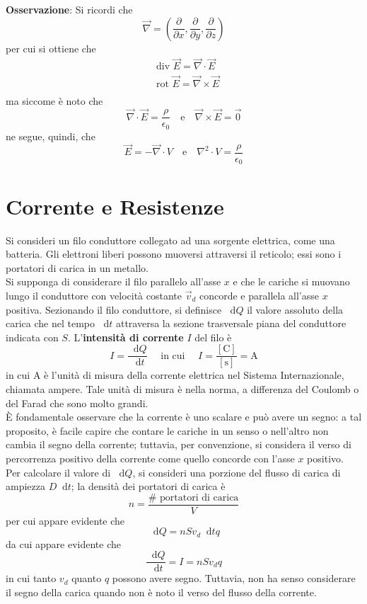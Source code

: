 \documentclass[a4paper]{extarticle}
\newcommand\dif{\mathop{}\!\mathrm{d}}
\begin{document}
\vspace{1em}
\noindent
\textbf{Osservazione}: Si ricordi che
\[\vec \nabla = \left(\dfrac{\partial}{\partial x}, \dfrac{\partial}{\partial y}, \dfrac{\partial}{\partial z}\right)\]
per cui si ottiene che
\begin{align*}
  & \text{div } \vec E = \vec \nabla \cdot \vec E\\
  & \text{rot } \vec E = \vec \nabla \times \vec E\\
\end{align*}
ma siccome è noto che
\[\vec \nabla \cdot \vec E = \dfrac{\rho}{\epsilon_0} \hspace{1em} \text{e} \hspace{1em} \vec \nabla \times \vec E = \vec 0\]
ne segue, quindi, che
\[\vec E = - \vec \nabla \cdot V \hspace{1em} \text{e} \hspace{1em} \nabla^2 \cdot V = \dfrac{\rho}{\epsilon_0}\]

\newpage
\noindent
\section{Corrente e Resistenze}
Si consideri un filo conduttore collegato ad una sorgente elettrica, come una batteria. Gli elettroni liberi possono muoversi attraversi il reticolo; essi sono i portatori di carica in un metallo.\\
Si supponga di considerare il filo parallelo all'asse $x$ e che le cariche si muovano lungo il conduttore con velocità costante $\vec{v}_d$ concorde e parallela all'asse $x$ positiva. Sezionando il filo conduttore, si definisce $\dif Q$ il valore assoluto della carica che nel tempo $\dif t$ attraversa la sezione trasversale piana del conduttore indicata con $S$. L'\textbf{intensità di corrente} $I$ del filo è
\[\boxed{I=\dfrac{\dif Q}{\dif t}} \hspace{1em} \text{ in cui } \hspace{1em} I = \dfrac{[\text{C}]}{[\text{s}]} = \text{A}\]
in cui A è l'unità di misura della corrente elettrica nel Sistema Internazionale, chiamata ampere. Tale unità di misura è nella norma, a differenza del Coulomb o del Farad che sono molto grandi.\\
È fondamentale osservare che la corrente è uno scalare e può avere un segno: a tal proposito, è facile capire che contare le cariche in un senso o nell'altro non cambia il segno della corrente; tuttavia, per convenzione, si considera il verso di percorrenza positivo della corrente come quello concorde con l'asse $x$ positivo.\\
Per calcolare il valore di $\dif Q$, si consideri una porzione del flusso di carica di ampiezza $D \dif t$; la densità dei portatori di carica è
\[n = \dfrac{\# \text{ portatori di carica}}{V}\]
per cui appare evidente che
\[\dif Q = n S v_d \dif t q\]
da cui appare evidente che
\[\dfrac{\dif Q}{\dif t} = I = n S v_d q\]
in cui tanto $v_d$ quanto $q$ possono avere segno. Tuttavia, non ha senso considerare il segno della carica quando non è noto il verso del flusso della corrente.
\end{document}
